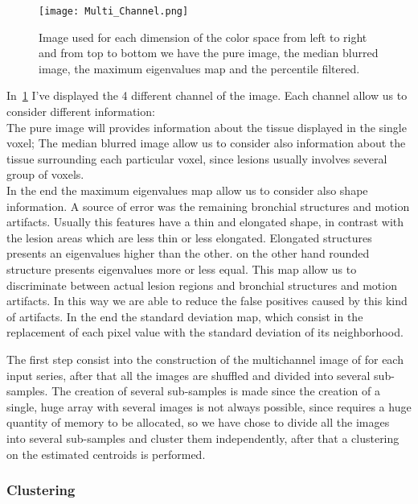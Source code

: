 		\begin{figure}[h]
			\centering
				\texttt{[image: Multi\_Channel.png]}
			\label{fig:MultiChannel}\caption{Image used for each dimension of the color space from left to right and from top to bottom we have the pure image, the median blurred image, the maximum eigenvalues map  and the percentile filtered.}
		\end{figure}
	
		In \figurename\,\ref{fig:MultiChannel} I've displayed the 4 different channel of the image. Each channel allow us to consider different information:\\ 
		The pure image will provides information about the tissue displayed in the single voxel; 
		The median blurred image allow us to consider also information about the tissue surrounding each particular voxel, since lesions usually involves several group of voxels.\\
		In the end the maximum eigenvalues map allow us to consider also shape information. A source of error was the remaining bronchial structures and  motion artifacts. Usually this features have a thin and elongated shape, in contrast with the lesion areas which are less thin or less elongated. Elongated structures presents an eigenvalues higher than the other. on the other hand rounded structure presents eigenvalues more or less equal. This map allow us to discriminate between actual lesion regions and bronchial structures and motion artifacts.  In this way we are able to reduce the false positives caused by this kind of artifacts. In the end the standard deviation map, which consist in the replacement of each pixel value with the standard deviation of its neighborhood. 
		
		The first step consist into the construction of the multichannel image of for each input series, after that all the images are shuffled and divided into several sub-samples. The creation of several sub-samples is made since the creation of a single, huge array with several images is not always possible, since requires a huge quantity of memory to be allocated, so we have chose to divide all the images into several sub-samples and cluster them independently, after that a clustering on the estimated centroids is performed.\\

		
		\subsubsection*{Clustering} 
		

